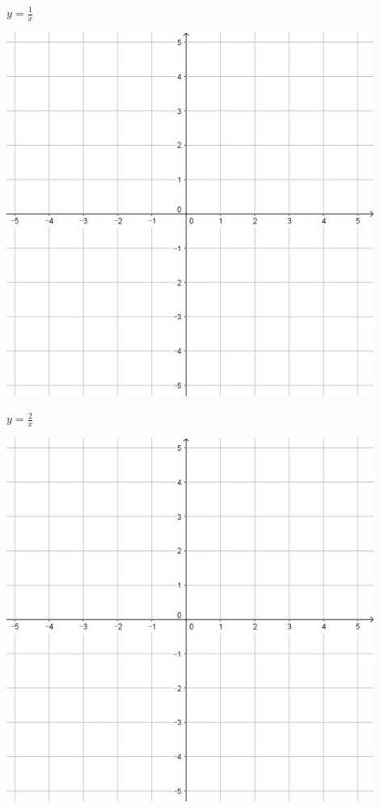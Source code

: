 \documentclass{oblivoir}
\begin{document}
\clearpage
\begin{minipage}{0.45\textwidth}\centering
\(y=\frac1x\)
\par\bigskip\includegraphics[width=0.9\textwidth]{55}
\end{minipage}
\begin{minipage}{0.45\textwidth}\centering
\(y=\frac2x\)
\par\bigskip\includegraphics[width=0.9\textwidth]{55}
\end{minipage}\bigskip\bigskip\par
\end{document}
